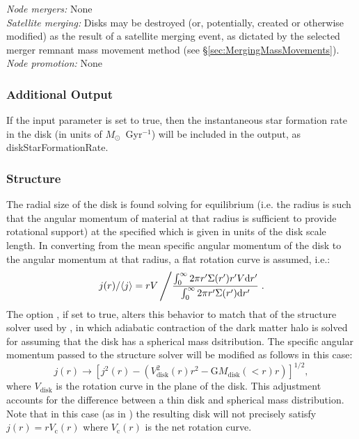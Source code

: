 \noindent\emph{Node mergers:} None\\

\noindent\emph{Satellite merging:} Disks may be destroyed (or, potentially, created or otherwise modified) as the result of a satellite merging event, as dictated by the selected merger remnant mass movement method (see \S\ref{sec:MergingMassMovements}).\\

\noindent\emph{Node promotion:} None\\

\subsubsection{Additional Output}

If the {\normalfont \ttfamily [diskOutputStarFormationRate]} input parameter is set to true, then the instantaneous star formation rate in the disk (in units of $M_\odot$~Gyr$^{-1}$) will be included in the output, as {\normalfont \ttfamily diskStarFormationRate}.

\subsubsection{Structure}

The radial size of the disk is found solving for equilibrium (i.e. the radius is such that the angular momentum of material at that radius is sufficient to provide rotational support) at the specified {\normalfont \ttfamily [diskStructureSolverRadius]} which is given in units of the disk scale length. In converting from the mean specific angular momentum of the disk to the angular momentum at that radius, a flat rotation curve is assumed, i.e.:
\begin{equation}
 j(r)/\langle j \rangle = r V \left/ {\int_0^\infty 2 \pi r^\prime \Sigma(r^\prime) r^\prime V \mathrm{d} r^\prime \over \int_0^\infty 2 \pi r^\prime \Sigma(r^\prime) \mathrm{d} r^\prime} \right. .
\end{equation}
The option {\normalfont {}}, if set to {\normalfont \ttfamily true}, alters this behavior to match that of the structure solver used by \cite{cole_hierarchical_2000}, in which adiabatic contraction of the dark matter halo is solved for assuming that the disk has a spherical mass dsitribution. The specific angular momentum passed to the structure solver will be modified as follows in this case:
\begin{equation}
 j(r) \rightarrow \left[ j^2(r) - \left( V_\mathrm{disk}^2(r) r^2 - \mathrm{G} M_\mathrm{disk}(<r) r \right) \right]^{1/2},
\end{equation}
where $V_\mathrm{disk}$ is the rotation curve in the plane of the disk. This adjustment accounts for the difference between a thin disk and spherical mass distribution. Note that in this case (as in \citealt{cole_hierarchical_2000}) the resulting disk will not precisely satisfy $j(r) = r V_\mathrm{c}(r)$ where $V_\mathrm{c}(r)$ is the net rotation curve.

